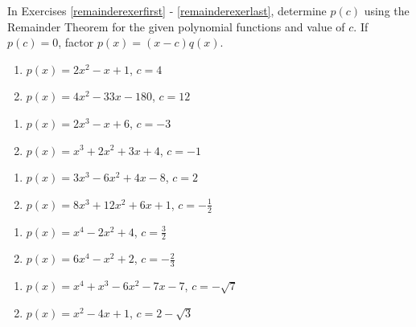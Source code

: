 In Exercises \ref{remainderexerfirst} - \ref{remainderexerlast}, determine $p(c)$ using the Remainder Theorem for the given polynomial functions and value of $c$.  If $p(c) = 0$, factor $p(x) = (x-c) q(x)$.

\begin{multicols}{2}
\begin{enumerate}
\setcounter{enumi}{\value{HW}}

\item $p(x) = 2x^2 - x + 1$, $c = 4$ \label{remainderexerfirst}
\item $p(x) = 4x^2-33x-180$, $c = 12$

\setcounter{HW}{\value{enumi}}
\end{enumerate}
\end{multicols}


\begin{multicols}{2}
\begin{enumerate}
\setcounter{enumi}{\value{HW}}

\item $p(x) = 2x^3 - x + 6$, $c=-3$
\item $p(x) = x^3+2x^2+3x+4$, $c =-1$

\setcounter{HW}{\value{enumi}}
\end{enumerate}
\end{multicols}

\begin{multicols}{2}
\begin{enumerate}
\setcounter{enumi}{\value{HW}}

\item $p(x) =3x^3-6x^2+4x-8$, $c=2$
\item $p(x) = 8x^3+12x^2+6x+1$, $c =-\frac{1}{2}$

\setcounter{HW}{\value{enumi}}
\end{enumerate}
\end{multicols}

\begin{multicols}{2}
\begin{enumerate}
\setcounter{enumi}{\value{HW}}

\item $p(x) = x^4 - 2x^2+4$, $c=\frac{3}{2}$
\item $p(x) = 6x^4-x^2+2$, $c =-\frac{2}{3}$

\setcounter{HW}{\value{enumi}}
\end{enumerate}
\end{multicols}


\begin{multicols}{2}
\begin{enumerate}
\setcounter{enumi}{\value{HW}}

\item $p(x) = x^4 +x^3-6x^2-7x-7$, $c=-\sqrt{7}$
\item $p(x) = x^2-4x+1$, $c =2-\sqrt{3}$ \label{remainderexerlast}

\setcounter{HW}{\value{enumi}}
\end{enumerate}
\end{multicols}

